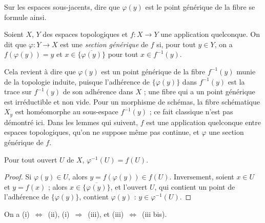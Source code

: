Sur les espaces sous-jacents, dire que $\varphi(y)$ est le point générique de la fibre se formule ainsi.

\begin{definition}
Soient $X$, $Y$ des espaces topologiques et $f : X \to Y$ une application quelconque. On dit que $\varphi : Y \to X$ est une \emph{section générique} de $f$ si, pour tout $y \in Y$, on a $f(\varphi(y)) = y$ et $x \in \overline{\{\varphi(y)\}}$ pour tout $x \in f^{-1}(y)$.
\end{definition}

\noindent Cela revient à dire que $\varphi(y)$ est un point générique de la fibre $f^{-1}(y)$ munie de la topologie induite, puisque l'adhérence de $\{\varphi(y)\}$ dans $f^{-1}(y)$ est la trace sur $f^{-1}(y)$ de son adhérence dans $X$ ; une fibre qui a un point générique est irréductible et non vide. Pour un morphisme de schémas, la fibre schématique $X_y$ est homéomorphe au sous-espace $f^{-1}(y)$ ; ce fait classique n'est pas démontré ici. Dans les lemmes qui suivent, $f$ est une application quelconque entre espaces topologiques, qu'on ne suppose même pas continue, et $\varphi$ une section générique de $f$.

\begin{lemme}\label{lem:41-formule}
Pour tout ouvert $U$ de $X$, $\varphi^{-1}(U) = f(U)$.
\end{lemme}

\begin{proof}
Si $\varphi(y) \in U$, alors $y = f(\varphi(y)) \in f(U)$. Inversement, soient $x \in U$ et $y = f(x)$ ; alors $x \in \overline{\{\varphi(y)\}}$, et l'ouvert $U$, qui contient un point de l'adhérence de $\{\varphi(y)\}$, contient $\varphi(y)$ : $y \in \varphi^{-1}(U)$.
\end{proof}

\begin{lemme}\label{lem:41-top}
On a (i)~$\Leftrightarrow$~(ii), (i)~$\Rightarrow$~(iii), et (iii)~$\Leftrightarrow$~(iii bis).
\end{lemme}

